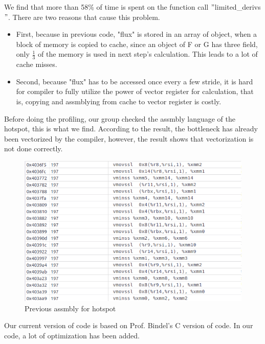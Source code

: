 \documentclass[11pt]{article}
\begin{document}
        We find that more than 58\% of time is spent on the function call $"$limited\_derivs$"$. 
        There are two reasons that cause this problem.
        \begin{itemize}
            \item First, because in previous code, "flux" is stored in an array of object, 
            when a block of memory is copied to cache, since an object of F or G has three field, 
            only $\frac{1}{3}$ of the memory is used in next step's calculation. 
            This leads to a lot of cache misses. 
            \item Second, because "flux" has to be accessed once every a few stride, 
            it is hard for compiler to fully utilize the power of vector register for calculation, 
            that is, copying and assmblying from cache to vector register is costly.
        \end{itemize}

        Before doing the profiling, our group checked the assmbly language of the hotspot, 
        this is what we find. According to the result, the bottleneck has already been vectorized
        by the compiler, however, the result shows that vectorization is not done correctly. 

        \clearpage
        
        \begin{figure}[H]
            \centering
            \includegraphics[width=4.5in]{assmbly_previous.png}
            \caption{Previous assmbly for hotspot}
        \end{figure}

    	Our current version of code is based on Prof. Bindel's C version of code. In our code,
        a lot of optimization has been added.
        
\end{document}
